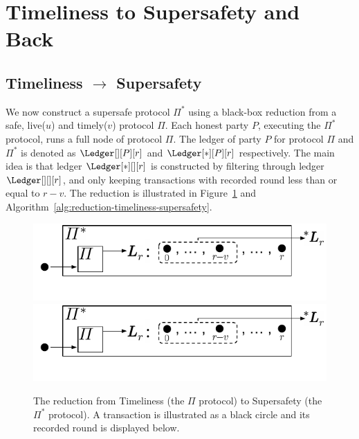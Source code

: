 \section{Timeliness to Supersafety and Back}\label{sec:forward-reduction}

\subsection{Timeliness $\rightarrow$ Supersafety}

We now construct a supersafe protocol
$\Pi^*$ using a black-box reduction from a safe, live($u$) and timely($v$)
protocol $\Pi$.
Each honest party $P$, executing the $\Pi^*$ protocol, runs a
full node of protocol $\Pi$.
The ledger of party $P$ for protocol $\Pi$ and $\Pi^*$ is denoted as $\Ledger[][P][r]$ and
$\Ledger[*][P][r]$ respectively.
The main idea is that ledger $\Ledger[*][][r]$ is constructed
by filtering through ledger $\Ledger[][][r]$, and only keeping transactions
with recorded round less than or equal to $r - v$.
The reduction is illustrated
in Figure~\ref{fig:reduction-timeliness-supersafety} and Algorithm~\ref{alg:reduction-timeliness-supersafety}.

\begin{figure}
  \centering
  \iflncs
    \includegraphics[width=0.7\columnwidth,keepaspectratio]{figures/forward-reduction.pdf}
  \fi
  \ifccs
    \includegraphics[width=1.1\columnwidth,keepaspectratio]{figures/forward-reduction.pdf}
  \fi
  \caption{The reduction from Timeliness
    (the $\Pi$ protocol) to Supersafety (the $\Pi^*$ protocol). A transaction is illustrated
    as a black circle and its recorded round is displayed below.
  }
 \label{fig:reduction-timeliness-supersafety}
\end{figure}

